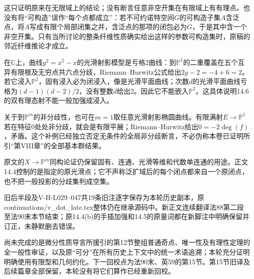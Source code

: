 这只证明原来在无限域上的结论；没有断言任意非空开集在有限域上有有理点。也没有将“可构造”误作“每个点都成立”：若不可约诺特空间$G$的可构造子集$A$含泛点，将$A$写成有限个局部闭集之并，含泛点的那项的闭包必为$G$，于是其中含一个非空开集。只有当所讨论的整条纤维性质确实给出这样的参数可构造集时，原稿的邻近纤维推论才成立。

在$\mathbb C$上，曲线$y^2=x^5-x$的光滑射影模型是亏格2曲线：到$\mathbb P^1$的二重覆盖在五个互异有限根及无穷点共六点分歧，Riemann--Hurwitz公式给出$2g-2=-4+6=2$。若它浸入$\mathbb P^2$，固有浸入必为闭浸入，像是光滑平面曲线；次数$d$的光滑平面曲线亏格为$(d-1)(d-2)/2$，没有整数$d$给出2。因此它不能嵌入$\mathbb P^2$。这具体说明14.6的双有理态射不能一般加强成浸入。

关于到$\mathbb P^m$的非分歧性，也可在$m=1$取任意光滑射影椭圆曲线。有限满射$E\to\mathbb P^1$若在特征0处处非分歧，就会是有限平展；Riemann--Hurwitz给出$0=-2\deg(f)$，矛盾。这个补例已经独立否定无条件的全局非分歧断言，不必伪称本卷已证明所引“第VIII章”的全部基本群结果。

原文的$X\to\mathbb P^m$同构论证仍保留固有、连通、光滑等维和代数单连通的用途。正文14.4控制的是指定的原光滑点；它不声称泛扩域后的每个闭点都来自一个原闭点，也不把一般投影的分歧集判成空集。

旧后半段及V-H-L029--047共19条旧注逐字保存为本轮历史副本，原continuations/v\_dot\_late.tex整体仍在继承源码中。新正文连续翻译法88第二段至法90末本节结束；原14.4(b)的手插加强和14.5的原量词都在新脚注中明确保留并订正，未静默删去错误。

尚未完成的是微分性质导言所援引的第12节整组普通奇点、唯一性及有理性定理的全一般性审证，以及原“可分”在所有历史上下文中的统一术语追溯；本轮充分证明明确使用有限型和几何约化。下一回校点为法90末、英59的第15节。第15节旧译及后续篇章全部保留，本轮没有将它们算作已经重新回校。

